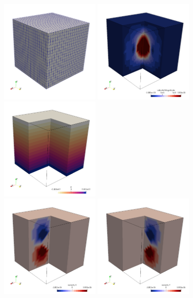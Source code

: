\begin{center}
\includegraphics[width=5cm]{python_codes/fieldstone_82/results/sphere/grid.png}
\includegraphics[width=5cm]{python_codes/fieldstone_82/results/sphere/vel.png}
\includegraphics[width=5cm]{python_codes/fieldstone_82/results/sphere/press.png}\\
\includegraphics[width=5cm]{python_codes/fieldstone_82/results/sphere/u.png}
\includegraphics[width=5cm]{python_codes/fieldstone_82/results/sphere/v.png}

\end{center}
